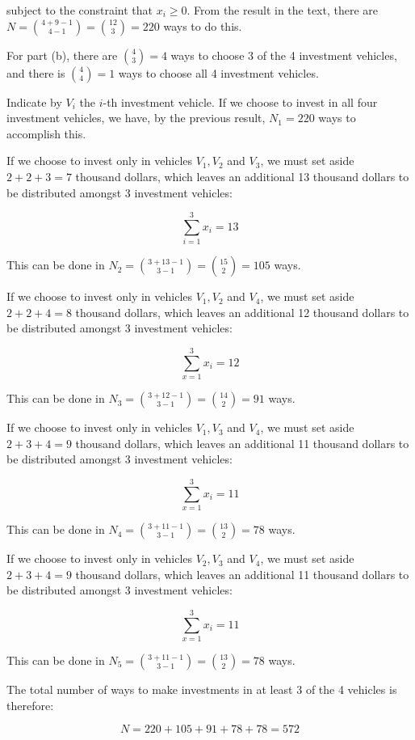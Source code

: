 \documentclass[a4paper,12pt]{article}
\begin{document}
\noindent
subject to the constraint that $x_i \ge 0$. From the result in the text, there are $N = \binom{4+9-1}{4-1} = \binom{12}{3} = 220$ ways to do this. 

For part (b), there are $\binom{4}{3} = 4$ ways to choose 3 of the 4 investment vehicles, and there is $\binom{4}{4} = 1$ ways to choose all 4 investment vehicles. 

Indicate by $V_i$ the $i$-th investment vehicle. If we choose to invest in all four investment vehicles, we have, by the previous result, $N_1 = 220$ ways to accomplish this. 

If we choose to invest only in vehicles $V_1, V_2$ and $V_3$, we must set aside $2+2+3 = 7$ thousand dollars, which leaves an additional 13 thousand dollars to be distributed amongst 3 investment vehicles: 

\[ \sum_{i=1}^3 x_i = 13 \]

\noindent
This can be done in $N_2 = \binom{3+13-1}{3-1} = \binom{15}{2} = 105$ ways. 

If we choose to invest only in vehicles $V_1, V_2$ and $V_4$, we must set aside $2+2+4 = 8$ thousand dollars, which leaves an additional 12 thousand dollars to be distributed amongst 3 investment vehicles:

\[ \sum_{x=1}^3 x_i = 12 \]

\noindent
This can be done in $N_3 = \binom{3+12-1}{3-1} = \binom{14}{2} = 91$ ways. 

If we choose to invest only in vehicles $V_1, V_3$ and $V_4$, we must set aside $2+3+4 = 9$ thousand dollars, which leaves an additional 11 thousand dollars to be distributed amongst 3 investment vehicles:

\[ \sum_{x=1}^3 x_i = 11 \]

\noindent
This can be done in $N_4 = \binom{3+11-1}{3-1} = \binom{13}{2} = 78$ ways.

If we choose to invest only in vehicles $V_2, V_3$ and $V_4$, we must set aside $2+3+4 = 9$ thousand dollars, which leaves an additional 11 thousand dollars to be distributed amongst 3 investment vehicles:

\[ \sum_{x=1}^3 x_i = 11 \]

\noindent
This can be done in $N_5 = \binom{3+11-1}{3-1} = \binom{13}{2} = 78$ ways. 

The total number of ways to make investments in at least 3 of the 4 vehicles is therefore:

\[ N = 220 + 105 + 91 + 78 + 78 = 572 \]
\end{document}
